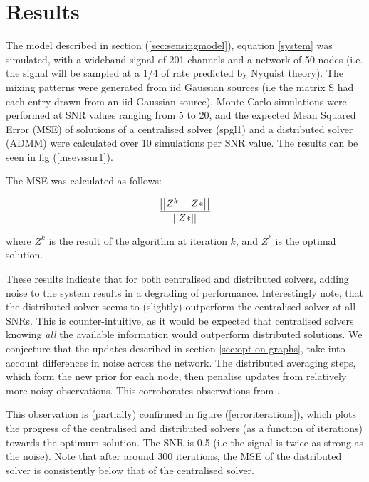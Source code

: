 \documentclass{article}
\begin{document}
\section{Results} \label{sec:results}

The model described in section (\ref{sec:sensingmodel}), equation \eqref{system} was simulated, with a wideband signal of 201 channels and a network of 50 nodes (i.e. the signal will be sampled at a 1/4 of rate predicted by Nyquist theory). The mixing patterns were generated from iid Gaussian sources (i.e the matrix S had each entry drawn from an iid Gaussian source). Monte Carlo simulations were performed at SNR values ranging from 5 to 20, and the expected Mean Squared Error (MSE) of solutions of a centralised solver (spgl1) and a distributed solver (ADMM) were calculated over 10 simulations per SNR value. The results can be seen in fig (\ref{msevssnr1}). 

The MSE was calculated as follows:

\begin{equation}
\frac{\left|\left|Z^k - Z*\right|\right|}{\left|\left|Z*\right|\right|}
\end{equation}

where \(Z^k\) is the result of the algorithm at iteration \(k\), and \(Z^*\) is the optimal solution.

These results indicate that for both centralised and distributed solvers, adding noise to the system results in a degrading of performance. Interestingly note, that the distributed solver seems to (slightly) outperform the centralised solver at all SNRs. This is counter-intuitive, as it would be expected that centralised solvers knowing \textit{all} the available information would outperform distributed solutions. We conjecture that the updates described in section \eqref{sec:opt-on-graphs}, take into account differences in noise across the network. The distributed averaging steps, which form the new prior for each node, then penalise updates from relatively more noisy observations. This corroborates observations from \cite{bazerque2008}.

This observation is (partially) confirmed in figure (\ref{erroriterations}), which plots the progress of the centralised and distributed solvers (as a function of iterations) towards the optimum solution. The SNR is 0.5 (i.e the signal is twice as strong as the noise). Note that after around 300 iterations, the MSE of the distributed solver is consistently below that of the centralised solver.
\end{document}
